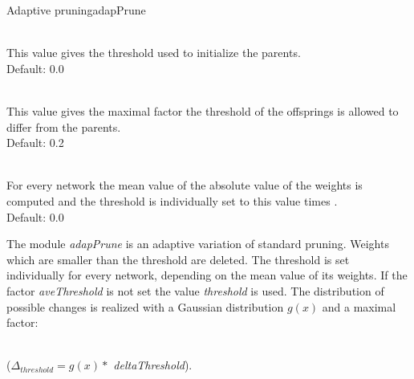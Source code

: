 \begin{moduledoc}{Adaptive pruning}{adapPrune}
  \item[\KeyWord{threshold} \optParam{ x } ]~\\
    This value gives the threshold used to initialize the parents.\\	
    Default: 0.0
  \item[\KeyWord{deltaThreshold} \optParam{ x } ]~\\
    This value gives the maximal factor the threshold of the offsprings
    is allowed to differ from the parents.\\	
    Default: 0.2
  \item[\KeyWord{aveThreshold} \optParam{ x } ]~\\
    For every network the mean value of the absolute value of the weights
    is computed and the threshold is individually set to this value times
    .\\
    Default: 0.0
\end{moduledoc}
The module {\it adapPrune} is an adaptive variation of standard pruning.
Weights which are smaller than the threshold are deleted.
The threshold is set individually for every network, depending on the mean value
of its weights. If the factor {\it aveThreshold} is not set the value {\it threshold}
is used. The distribution of possible changes is realized with a Gaussian
distribution $g(x)$ and a maximal factor: \\
\\
\centerline{($\Delta_{threshold} =   g(x) *  $ {\it deltaThreshold}).}


